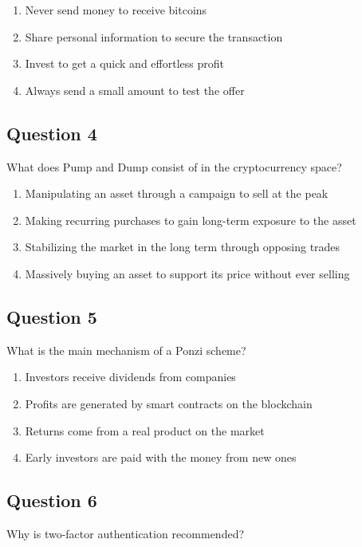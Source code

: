 \documentclass[12pt,a4paper]{article}
\begin{document}
\begin{enumerate}[label=\Alph*., leftmargin=*]
\item Never send money to receive bitcoins
\item Share personal information to secure the transaction
\item Invest to get a quick and effortless profit
\item Always send a small amount to test the offer
\end{enumerate}

\bigskip


\subsection*{Question 4}
What does Pump and Dump consist of in the cryptocurrency space?

\begin{enumerate}[label=\Alph*., leftmargin=*]
\item Manipulating an asset through a campaign to sell at the peak
\item Making recurring purchases to gain long-term exposure to the asset
\item Stabilizing the market in the long term through opposing trades
\item Massively buying an asset to support its price without ever selling
\end{enumerate}

\bigskip


\subsection*{Question 5}
What is the main mechanism of a Ponzi scheme?

\begin{enumerate}[label=\Alph*., leftmargin=*]
\item Investors receive dividends from companies
\item Profits are generated by smart contracts on the blockchain
\item Returns come from a real product on the market
\item Early investors are paid with the money from new ones
\end{enumerate}

\bigskip


\subsection*{Question 6}
Why is two-factor authentication recommended?
\end{document}

